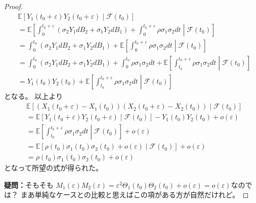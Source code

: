 \documentclass[uplatex]{jsarticle}
\theoremstyle{definition}
\def\ep{\varepsilon}
\def\E{\mathbb{E}}
\def\mcF{\mathcal{F}}
\begin{document}
\begin{proof}
  \begin{align*}
    &\E[Y_1(t_0 + \ep) Y_2(t_0 + \ep) \mid \mcF(t_0)] \\
    &= \E\left[
    \int_0^{t_0+\ep} (\sigma_2Y_1dB_2 + \sigma_1Y_2dB_1)
    + \int_0^{t_0+\ep} \rho\sigma_1\sigma_2dt
    \middle| \mcF(t_0)\right] \\
    &= \int_0^{t_0} (\sigma_2Y_1dB_2 + \sigma_1Y_2dB_1)
    + \E\left[ \int_0^{t_0+\ep} \rho\sigma_1\sigma_2dt
    \middle| \mcF(t_0)\right] \\
    &= \int_0^{t_0} (\sigma_2Y_1dB_2 + \sigma_1Y_2dB_1)
    + \int_0^{t_0}\rho\sigma_1\sigma_2dt
    + \E\left[ \int_{t_0}^{t_0+\ep} \rho\sigma_1\sigma_2dt
    \middle| \mcF(t_0)\right] \\
    &= Y_1(t_0)Y_2(t_0)
    + \E\left[ \int_{t_0}^{t_0+\ep} \rho\sigma_1\sigma_2dt
    \middle| \mcF(t_0)\right]
  \end{align*}
  となる。
  以上より
  \begin{align*}
    &\E[(X_1(t_0+\ep) - X_1(t_0))(X_2(t_0+\ep) - X_2(t_0))
    \mid \mcF(t_0)]\\
    &= \E[Y_1(t_0 + \ep) Y_2(t_0 + \ep) \mid \mcF(t_0)]
    - Y_1(t_0)Y_2(t_0) + o(\ep) \\
    &= \E\left[ \int_{t_0}^{t_0+\ep} \rho\sigma_1\sigma_2dt
    \middle| \mcF(t_0)\right] + o(\ep) \\
    &= \E\left[ \rho(t_0)\sigma_1(t_0)\sigma_2(t_0) + o(\ep)
    \middle| \mcF(t_0)\right] + o(\ep) \\
    &= \rho(t_0)\sigma_1(t_0)\sigma_2(t_0) + o(\ep)
  \end{align*}
  となって所望の式が得られた。

  \textbf{疑問：}そもそも
  \(M_1(\ep)M_2(\ep)
  = \ep^2\Theta_1(t_0)\Theta_2(t_0) + o(\ep) = o(\ep)\)なのでは？
  まあ単純なケースとの比較と思えばこの項がある方が自然だけれど。


\end{proof}
\end{document}
